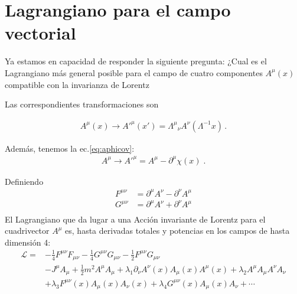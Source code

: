 \section{Lagrangiano para el campo vectorial}
\begin{frame}
Ya estamos en capacidad de responder la siguiente pregunta: ¿Cual es el Lagrangiano más general posible para el campo de cuatro componentes $A^{\mu}(x)$ compatible con la invarianza de Lorentz 

Las correspondientes transformaciones son

\begin{align}
  A^\mu(x)\to {A'}^\mu(x')={\Lambda^\mu}_\nu A^\nu(\Lambda^{-1}x)\,.
\end{align}

Además, tenemos la ec.\eqref{eq:aphicov}:
\begin{align}
\label{eq:172qft}
  A^\mu\to{A'}^\mu=A^\mu-\partial^\mu\chi(x)\;.
\end{align}




Definiendo
\begin{align*}
  F^{\mu\nu}&=\partial^\mu A^\nu-\partial^\nu A^\mu\\
  G^{\mu\nu}&=\partial^\mu A^\nu+\partial^\nu A^\mu\\
\end{align*}
El Lagrangiano que da lugar a una Acción invariante de Lorentz para el cuadrivector $A^\mu$
es, hasta derivadas totales y potencias en los campos de hasta dimensión 4:
\begin{align}
  \mathcal{L}=&-\frac{1}{4}F^{\mu\nu}F_{\mu\nu}-\frac{1}{4}G^{\mu\nu}G_{\mu\nu}-\frac{1}{2}F^{\mu\nu}G_{\mu\nu}\nonumber\\
&-J^\mu A_\mu+
 \frac{1}{2}m^2A^\mu A_\mu +\lambda_1\partial_\nu A^\nu(x) A_\mu(x) A^\mu(x)+\lambda_2 A^\mu A_\mu A^\nu A_\nu\nonumber\\
&+\lambda_3 F^{\mu\nu}(x)A_\mu(x) A_\nu(x)+\lambda_4G^{\mu\nu}(x)A_\mu(x) A_\nu+\cdots
  \label{eq:lagAmu}
\end{align}
\end{frame}

